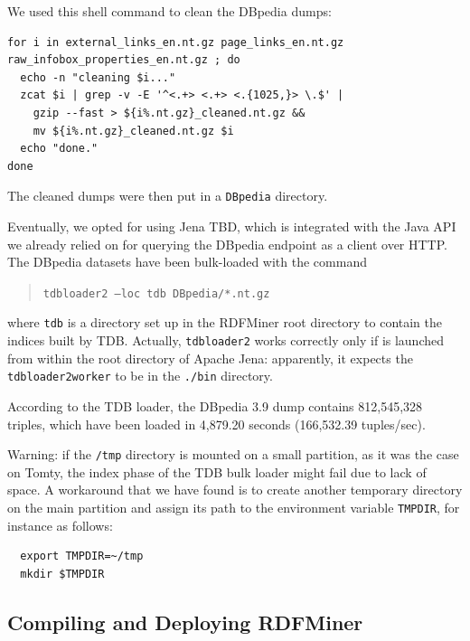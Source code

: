 \documentclass[a4paper]{article}
\newcounter{ex}
\begin{document}
We used this shell command to clean the DBpedia dumps:
\begin{verbatim}
for i in external_links_en.nt.gz page_links_en.nt.gz raw_infobox_properties_en.nt.gz ; do
  echo -n "cleaning $i..."
  zcat $i | grep -v -E '^<.+> <.+> <.{1025,}> \.$' |
    gzip --fast > ${i%.nt.gz}_cleaned.nt.gz &&
    mv ${i%.nt.gz}_cleaned.nt.gz $i
  echo "done."
done\end{verbatim}
The cleaned dumps were then put in a \texttt{DBpedia} directory.




Eventually, we opted for using Jena TBD, which is integrated with the Java API
we already relied on for querying the DBpedia endpoint as a client over HTTP.
The DBpedia datasets have been bulk-loaded with the command
\begin{quotation}
  \texttt{tdbloader2 --loc tdb DBpedia/*.nt.gz}
\end{quotation}
where \texttt{tdb} is a directory set up in the RDFMiner root directory
to contain the indices built by TDB.
Actually, \texttt{tdbloader2} works correctly only if is launched from within
the root directory of Apache Jena: apparently, it expects the \texttt{tdbloader2worker}
to be in the \texttt{./bin} directory.

According to the TDB loader, the DBpedia 3.9 dump contains 812,545,328 triples,
which have been loaded in 4,879.20 seconds (166,532.39 tuples/sec).

Warning: if the \texttt{/tmp} directory is mounted on a small partition,
as it was the case on Tomty, the index phase of the TDB bulk loader might fail
due to lack of space. A workaround that we have found is to create another
temporary directory on the main partition and assign its path to the environment
variable \texttt{TMPDIR}, for instance as follows:
\begin{verbatim}
  export TMPDIR=~/tmp
  mkdir $TMPDIR
\end{verbatim}


\subsection{Compiling and Deploying RDFMiner}
\end{document}
